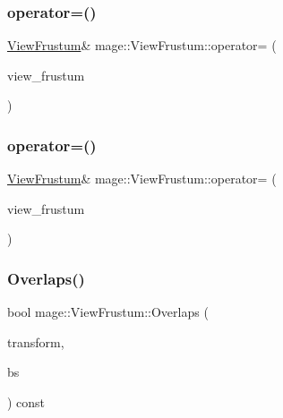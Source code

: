 \hypertarget{classmage_1_1_view_frustum_add514821f691117c0ab139c13f86ef70}{}\label{classmage_1_1_view_frustum_add514821f691117c0ab139c13f86ef70} 
\subsubsection{\texorpdfstring{operator=()}{operator=()}\hspace{0.1cm}{\footnotesize\ttfamily [1/2]}}
{\footnotesize\ttfamily \hyperlink{classmage_1_1_view_frustum}{View\+Frustum}\& mage\+::\+View\+Frustum\+::operator= (\begin{DoxyParamCaption}\item[{const \hyperlink{classmage_1_1_view_frustum}{View\+Frustum} \&}]{view\+\_\+frustum }\end{DoxyParamCaption})\hspace{0.3cm}{\ttfamily [default]}}

\hypertarget{classmage_1_1_view_frustum_a0167f34c3ba505155ed6064c6d98a99c}{}\label{classmage_1_1_view_frustum_a0167f34c3ba505155ed6064c6d98a99c} 
\subsubsection{\texorpdfstring{operator=()}{operator=()}\hspace{0.1cm}{\footnotesize\ttfamily [2/2]}}
{\footnotesize\ttfamily \hyperlink{classmage_1_1_view_frustum}{View\+Frustum}\& mage\+::\+View\+Frustum\+::operator= (\begin{DoxyParamCaption}\item[{\hyperlink{classmage_1_1_view_frustum}{View\+Frustum} \&\&}]{view\+\_\+frustum }\end{DoxyParamCaption})\hspace{0.3cm}{\ttfamily [default]}}

\hypertarget{classmage_1_1_view_frustum_ab45ef542b3bacf16390a8f223472bcd5}{}\label{classmage_1_1_view_frustum_ab45ef542b3bacf16390a8f223472bcd5} 
\subsubsection{\texorpdfstring{Overlaps()}{Overlaps()}\hspace{0.1cm}{\footnotesize\ttfamily [1/2]}}
{\footnotesize\ttfamily bool mage\+::\+View\+Frustum\+::\+Overlaps (\begin{DoxyParamCaption}\item[{const \hyperlink{structmage_1_1_transform}{Transform} \&}]{transform,  }\item[{const \hyperlink{structmage_1_1_b_s}{BS} \&}]{bs }\end{DoxyParamCaption}) const}

